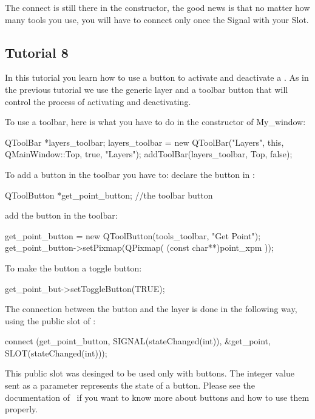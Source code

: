 The connect is still there in the constructor, the good news is that
no matter how many tools you use, you will have to connect only once
the {\sc Signal} with your {\sc Slot}.

\subsection*{Tutorial 8}

In this tutorial you learn how to use a button to activate and
deactivate a . As in the previous tutorial
we use the generic layer  and a
toolbar button that will control the process of activating and deactivating.

To use a toolbar, here is what you have to do in the constructor of My\_window:
\begin{ccExampleCode}
QToolBar  *layers_toolbar;
layers_toolbar = new QToolBar("Layers", this, QMainWindow::Top, true, "Layers");
addToolBar(layers_toolbar, Top, false);
\end{ccExampleCode}
To add a button in the toolbar you have to:
declare the button in :
\begin{ccExampleCode}
QToolButton *get_point_button;     //the toolbar button
\end{ccExampleCode}
add the button in the toolbar:
\begin{ccExampleCode}
get_point_button = new QToolButton(tools_toolbar, "Get Point");
get_point_button->setPixmap(QPixmap( (const char**)point_xpm ));
\end{ccExampleCode}
To make the button a toggle button:
\begin{ccExampleCode}
get_point_but->setToggleButton(TRUE);
\end{ccExampleCode}
The connection between the button and the layer is done in the
following way, using the  public slot of :
\begin{ccExampleCode}
connect (get_point_button, SIGNAL(stateChanged(int)),
         &get_point, SLOT(stateChanged(int)));
\end{ccExampleCode}
\begin{ccAdvanced}
This public slot was desinged to be used only with \qt\/ buttons. The
integer value sent as a parameter represents the state of a \qt\/
button. Please see the documentation of \qt\ if you want to know more
about buttons and how to use them properly.
\end{ccAdvanced}
